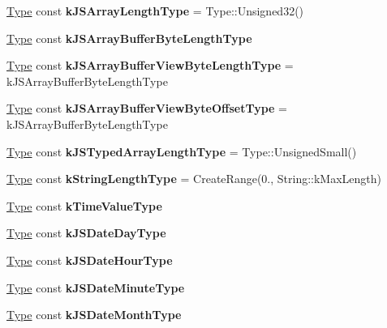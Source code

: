 \begin{DoxyCompactItemize}
\mbox{\hyperlink{classv8_1_1internal_1_1compiler_1_1Type}{Type}} const {\bfseries k\+J\+S\+Array\+Length\+Type} = Type\+::\+Unsigned32()
\item 
\mbox{\hyperlink{classv8_1_1internal_1_1compiler_1_1Type}{Type}} const {\bfseries k\+J\+S\+Array\+Buffer\+Byte\+Length\+Type}
\item 
\mbox{\label{classv8_1_1internal_1_1compiler_1_1TypeCache_ad8fa947923612239a77ecb0a89103d71}} 
\mbox{\hyperlink{classv8_1_1internal_1_1compiler_1_1Type}{Type}} const {\bfseries k\+J\+S\+Array\+Buffer\+View\+Byte\+Length\+Type} = k\+J\+S\+Array\+Buffer\+Byte\+Length\+Type
\item 
\mbox{\label{classv8_1_1internal_1_1compiler_1_1TypeCache_a63151e4b3f0395ec05739e7215834bb0}} 
\mbox{\hyperlink{classv8_1_1internal_1_1compiler_1_1Type}{Type}} const {\bfseries k\+J\+S\+Array\+Buffer\+View\+Byte\+Offset\+Type} = k\+J\+S\+Array\+Buffer\+Byte\+Length\+Type
\item 
\mbox{\label{classv8_1_1internal_1_1compiler_1_1TypeCache_a6c86960dda4589029fb6a70ac4c04565}} 
\mbox{\hyperlink{classv8_1_1internal_1_1compiler_1_1Type}{Type}} const {\bfseries k\+J\+S\+Typed\+Array\+Length\+Type} = Type\+::\+Unsigned\+Small()
\item 
\mbox{\label{classv8_1_1internal_1_1compiler_1_1TypeCache_a37004af1ed55a8692331e87813dcd15c}} 
\mbox{\hyperlink{classv8_1_1internal_1_1compiler_1_1Type}{Type}} const {\bfseries k\+String\+Length\+Type} = Create\+Range(0., String\+::k\+Max\+Length)
\item 
\mbox{\hyperlink{classv8_1_1internal_1_1compiler_1_1Type}{Type}} const {\bfseries k\+Time\+Value\+Type}
\item 
\mbox{\hyperlink{classv8_1_1internal_1_1compiler_1_1Type}{Type}} const {\bfseries k\+J\+S\+Date\+Day\+Type}
\item 
\mbox{\hyperlink{classv8_1_1internal_1_1compiler_1_1Type}{Type}} const {\bfseries k\+J\+S\+Date\+Hour\+Type}
\item 
\mbox{\hyperlink{classv8_1_1internal_1_1compiler_1_1Type}{Type}} const {\bfseries k\+J\+S\+Date\+Minute\+Type}
\item 
\mbox{\hyperlink{classv8_1_1internal_1_1compiler_1_1Type}{Type}} const {\bfseries k\+J\+S\+Date\+Month\+Type}

\end{DoxyCompactItemize}
